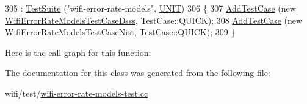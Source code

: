 \begin{DoxyCode}
305   : \hyperlink{classns3_1_1TestSuite_a904b0c40583b744d30908aeb94636d1a}{TestSuite} (\textcolor{stringliteral}{"wifi-error-rate-models"}, \hyperlink{classns3_1_1TestSuite_a1ebfcab34ec8161e085e8e3a1855eae0a3885375a3787abf60431f8454b3cadbd}{UNIT})
306 \{
307   \hyperlink{classns3_1_1TestCase_a3718088e3eefd5d6454569d2e0ddd835}{AddTestCase} (\textcolor{keyword}{new} \hyperlink{classWifiErrorRateModelsTestCaseDsss}{WifiErrorRateModelsTestCaseDsss}, 
      TestCase::QUICK);
308   \hyperlink{classns3_1_1TestCase_a3718088e3eefd5d6454569d2e0ddd835}{AddTestCase} (\textcolor{keyword}{new} \hyperlink{classWifiErrorRateModelsTestCaseNist}{WifiErrorRateModelsTestCaseNist}, 
      TestCase::QUICK);
309 \}
\end{DoxyCode}


Here is the call graph for this function\+:




The documentation for this class was generated from the following file\+:\begin{DoxyCompactItemize}
\item 
wifi/test/\hyperlink{wifi-error-rate-models-test_8cc}{wifi-\/error-\/rate-\/models-\/test.\+cc}\end{DoxyCompactItemize}
